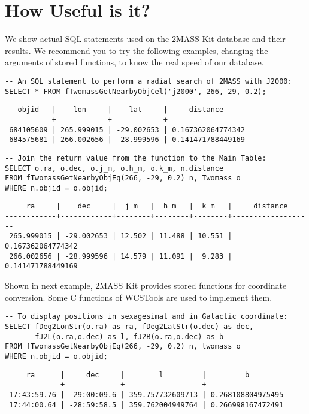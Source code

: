 \section{How Useful is it?}

We show actual SQL statements used on the 2MASS Kit database and their results. We recommend you to try the following examples, changing the arguments of stored functions, to know the real speed of our database.

\begin{verbatim}
-- An SQL statement to perform a radial search of 2MASS with J2000:
SELECT * FROM fTwomassGetNearbyObjCel('j2000', 266,-29, 0.2);
\end{verbatim}

{\small
\begin{verbatim}
   objid   |    lon     |    lat     |     distance      
-----------+------------+------------+-------------------
 684105609 | 265.999015 | -29.002653 | 0.167362064774342
 684575681 | 266.002656 | -28.999596 | 0.141471788449169
\end{verbatim}
}

\begin{verbatim}
-- Join the return value from the function to the Main Table:
SELECT o.ra, o.dec, o.j_m, o.h_m, o.k_m, n.distance
FROM fTwomassGetNearbyObjEq(266, -29, 0.2) n, Twomass o
WHERE n.objid = o.objid;
\end{verbatim}

{\small
\begin{verbatim}
     ra     |    dec     |  j_m   |  h_m   |  k_m   |     distance     
------------+------------+--------+--------+--------+-------------------
 265.999015 | -29.002653 | 12.502 | 11.488 | 10.551 | 0.167362064774342
 266.002656 | -28.999596 | 14.579 | 11.091 |  9.283 | 0.141471788449169
\end{verbatim}
}

Shown in next example, 2MASS Kit provides stored functions for coordinate conversion. Some C functions of WCSTools \citep{min_2006} are used to implement them.

\begin{verbatim}
-- To display positions in sexagesimal and in Galactic coordinate:
SELECT fDeg2LonStr(o.ra) as ra, fDeg2LatStr(o.dec) as dec, 
       fJ2L(o.ra,o.dec) as l, fJ2B(o.ra,o.dec) as b
FROM fTwomassGetNearbyObjEq(266, -29, 0.2) n, twomass o
WHERE n.objid = o.objid;
\end{verbatim}

{\small
\begin{verbatim}
     ra      |     dec     |        l         |         b         
-------------+-------------+------------------+-------------------
 17:43:59.76 | -29:00:09.6 | 359.757732609713 | 0.268108804975495
 17:44:00.64 | -28:59:58.5 | 359.762004949764 | 0.266998167472491
\end{verbatim}
}

